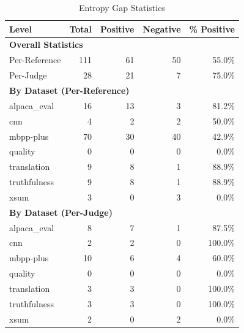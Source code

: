 \begin{table}[h]
\centering
\caption{Entropy Gap Statistics}
\begin{tabular}{lrrrr}
\hline
Level & Total & Positive & Negative & \% Positive \\
\hline
\multicolumn{5}{l}{\textbf{Overall Statistics}} \\
Per-Reference & 111 & 61 & 50 & 55.0\% \\
Per-Judge & 28 & 21 & 7 & 75.0\% \\
\hline
\multicolumn{5}{l}{\textbf{By Dataset (Per-Reference)}} \\
alpaca_eval & 16 & 13 & 3 & 81.2\% \\
cnn & 4 & 2 & 2 & 50.0\% \\
mbpp-plus & 70 & 30 & 40 & 42.9\% \\
quality & 0 & 0 & 0 & 0.0\% \\
translation & 9 & 8 & 1 & 88.9\% \\
truthfulness & 9 & 8 & 1 & 88.9\% \\
xsum & 3 & 0 & 3 & 0.0\% \\
\hline
\multicolumn{5}{l}{\textbf{By Dataset (Per-Judge)}} \\
alpaca_eval & 8 & 7 & 1 & 87.5\% \\
cnn & 2 & 2 & 0 & 100.0\% \\
mbpp-plus & 10 & 6 & 4 & 60.0\% \\
quality & 0 & 0 & 0 & 0.0\% \\
translation & 3 & 3 & 0 & 100.0\% \\
truthfulness & 3 & 3 & 0 & 100.0\% \\
xsum & 2 & 0 & 2 & 0.0\% \\
\hline
\end{tabular}
\end{table}